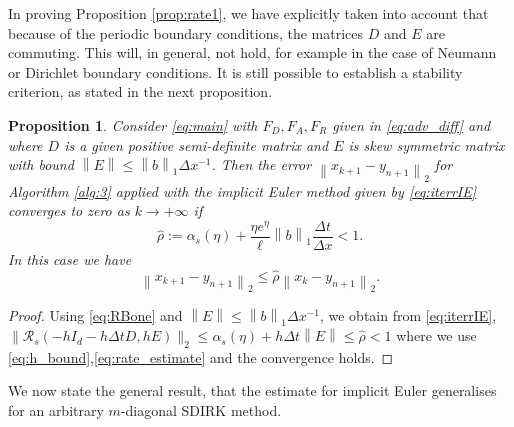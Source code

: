 \documentclass[10pt,a4paper]{article}
\newtheorem{proposition}[theorem]{Proposition}
\newcommand{\norm}[1]{\left\lVert #1 \right\rVert}
\begin{document}
In proving Proposition \ref{prop:rate1}, we have explicitly taken into account that because of the periodic boundary conditions, the matrices $D$ and  $E$ are commuting. This will, in general, not hold, for example in the case of Neumann or Dirichlet boundary conditions. It is still possible to establish a stability criterion, as stated in the next proposition. 

\begin{proposition} \label{prop:rate2}
Consider \eqref{eq:main} with $F_D,F_A,F_R$ given  in \eqref{eq:adv_diff} and where $D$ is a given positive semi-definite matrix and $E$ is skew symmetric matrix with bound $\norm{E} \leq \norm{b}_{1}\Delta x^{-1}$. Then the  error $\norm{x_{k+1}-y_{n+1}}_{2}$ for Algorithm \ref{alg:3} applied with the implicit Euler method given by \eqref{eq:iterrIE} converges to zero as $k\rightarrow+\infty$ if 
 \begin{equation} \label{eq:rate_estimate}
 \hat \rho := \alpha_s(\eta) + \frac{\eta e^\eta}{\ell}\norm{b}_{1}\frac{\Delta t}{\Delta x} < 1.
 \end{equation}
In this case we have
\[
\norm{x_{k+1}-y_{n+1}}_{2} \leq \hat \rho\norm{x_{k}-y_{n+1}}_{2}.
\]
\end{proposition}
\begin{proof} 
Using \eqref{eq:RBone}
and $\norm{E} \leq \norm{b}_{1}\Delta x^{-1}$, 
we obtain from \eqref{eq:iterrIE}, $ \|\mathcal{R}_{s}(-hI_d - h\Delta t D,hE) \|_2\leq  \alpha_s(\eta) + h \Delta t \norm{E} \leq \hat  \rho <1$ where we use  \eqref{eq:h_bound},\eqref{eq:rate_estimate} and the convergence holds.
\end{proof}




 





We now state the general result, that the estimate for implicit Euler generalises for an arbitrary $m$-diagonal SDIRK method. 




\end{document}
